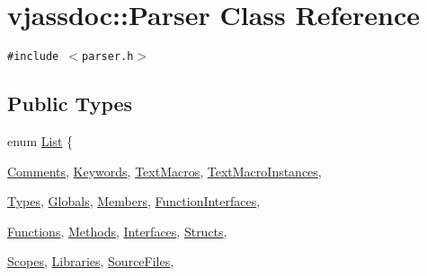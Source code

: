 \hypertarget{classvjassdoc_1_1Parser}{
\section{vjassdoc::Parser Class Reference}
\label{classvjassdoc_1_1Parser}
}
{\tt \#include $<$parser.h$>$}

\subsection*{Public Types}
\begin{CompactItemize}
\item 
enum \hyperlink{classvjassdoc_1_1Parser_4ef39527519272daf05a22b5276062ad}{List} \{ \par
\hyperlink{classvjassdoc_1_1Parser_4ef39527519272daf05a22b5276062adcf858442912f8df881558955e52e5887}{Comments}, 
\hyperlink{classvjassdoc_1_1Parser_4ef39527519272daf05a22b5276062ad5db2ad7fc4b83af98d459d0dfbe2124d}{Keywords}, 
\hyperlink{classvjassdoc_1_1Parser_4ef39527519272daf05a22b5276062adba95ff3a15a220d15be85440dcb26ab6}{TextMacros}, 
\hyperlink{classvjassdoc_1_1Parser_4ef39527519272daf05a22b5276062ad7e6bac25065c45fc4cbbe2e5e3cfec87}{TextMacroInstances}, 
\par
\hyperlink{classvjassdoc_1_1Parser_4ef39527519272daf05a22b5276062adf3b9448ea647fc1e6298c99fa0c6f383}{Types}, 
\hyperlink{classvjassdoc_1_1Parser_4ef39527519272daf05a22b5276062ad3159e03f1ca44fc548716dd4ecfddfa8}{Globals}, 
\hyperlink{classvjassdoc_1_1Parser_4ef39527519272daf05a22b5276062ad7a2e832cfc5290372e202fc5a1251b16}{Members}, 
\hyperlink{classvjassdoc_1_1Parser_4ef39527519272daf05a22b5276062ad0db3d17931a7b8e81e0315acd1c8f6da}{FunctionInterfaces}, 
\par
\hyperlink{classvjassdoc_1_1Parser_4ef39527519272daf05a22b5276062ad759eba0d2eb4743cf0e2d1352a9e8e7b}{Functions}, 
\hyperlink{classvjassdoc_1_1Parser_4ef39527519272daf05a22b5276062adacced66c17428de42e0a10b20199b78f}{Methods}, 
\hyperlink{classvjassdoc_1_1Parser_4ef39527519272daf05a22b5276062ad142565cddc2797c12864104943ad40d8}{Interfaces}, 
\hyperlink{classvjassdoc_1_1Parser_4ef39527519272daf05a22b5276062ad2a415665cf112c82bf0d5bf060f234ba}{Structs}, 
\par
\hyperlink{classvjassdoc_1_1Parser_4ef39527519272daf05a22b5276062ad6c367ef3e6ed37962291c55cbb617a9d}{Scopes}, 
\hyperlink{classvjassdoc_1_1Parser_4ef39527519272daf05a22b5276062adc038116803e65dbf80739e474ff67f09}{Libraries}, 
\hyperlink{classvjassdoc_1_1Parser_4ef39527519272daf05a22b5276062ad48e35734a8dfc110bce6d56a8705045b}{SourceFiles}, 

\end{CompactItemize}
